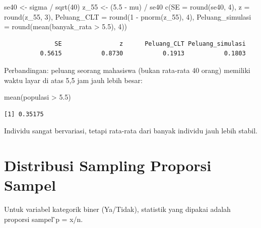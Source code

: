 \documentclass[
  indonesian,
  letterpaper,
]{book}
\newenvironment{Shaded}{\begin{snugshade}}{\end{snugshade}}
\newcommand{\AttributeTok}[1]{\textcolor[rgb]{0.40,0.45,0.13}{#1}}
\newcommand{\DecValTok}[1]{\textcolor[rgb]{0.68,0.00,0.00}{#1}}
\newcommand{\FloatTok}[1]{\textcolor[rgb]{0.68,0.00,0.00}{#1}}
\newcommand{\FunctionTok}[1]{\textcolor[rgb]{0.28,0.35,0.67}{#1}}
\newcommand{\NormalTok}[1]{\textcolor[rgb]{0.00,0.23,0.31}{#1}}
\newcommand{\OtherTok}[1]{\textcolor[rgb]{0.00,0.23,0.31}{#1}}
\newcommand{\SpecialCharTok}[1]{\textcolor[rgb]{0.37,0.37,0.37}{#1}}
\begin{document}
\begin{Shaded}
\begin{Highlighting}[]
\NormalTok{se40 }\OtherTok{\textless{}{-}}\NormalTok{ sigma }\SpecialCharTok{/} \FunctionTok{sqrt}\NormalTok{(}\DecValTok{40}\NormalTok{)}
\NormalTok{z\_55 }\OtherTok{\textless{}{-}}\NormalTok{ (}\FloatTok{5.5} \SpecialCharTok{{-}}\NormalTok{ mu) }\SpecialCharTok{/}\NormalTok{ se40}
\FunctionTok{c}\NormalTok{(}\AttributeTok{SE =} \FunctionTok{round}\NormalTok{(se40, }\DecValTok{4}\NormalTok{), }\AttributeTok{z =} \FunctionTok{round}\NormalTok{(z\_55, }\DecValTok{3}\NormalTok{),}
\AttributeTok{Peluang\_CLT =} \FunctionTok{round}\NormalTok{(}\DecValTok{1} \SpecialCharTok{{-}} \FunctionTok{pnorm}\NormalTok{(z\_55), }\DecValTok{4}\NormalTok{),}
\AttributeTok{Peluang\_simulasi =} \FunctionTok{round}\NormalTok{(}\FunctionTok{mean}\NormalTok{(banyak\_rata }\SpecialCharTok{\textgreater{}} \FloatTok{5.5}\NormalTok{), }\DecValTok{4}\NormalTok{))}
\end{Highlighting}
\end{Shaded}

\begin{verbatim}
              SE                z      Peluang_CLT Peluang_simulasi 
          0.5615           0.8730           0.1913           0.1803 
\end{verbatim}

Perbandingan: peluang seorang mahasiswa (bukan rata-rata 40 orang)
memiliki waktu layar di atas 5,5 jam jauh lebih besar:

\begin{Shaded}
\begin{Highlighting}[]
\FunctionTok{mean}\NormalTok{(populasi }\SpecialCharTok{\textgreater{}} \FloatTok{5.5}\NormalTok{)}
\end{Highlighting}
\end{Shaded}

\begin{verbatim}
[1] 0.35175
\end{verbatim}

Individu sangat bervariasi, tetapi rata-rata dari banyak individu jauh
lebih stabil.


\chapter{Distribusi Sampling Proporsi
Sampel}\label{distribusi-sampling-proporsi-sampel}

Untuk variabel kategorik biner (Ya/Tidak), statistik yang dipakai adalah
proporsi sampel ̂p = x/n.
\end{document}
